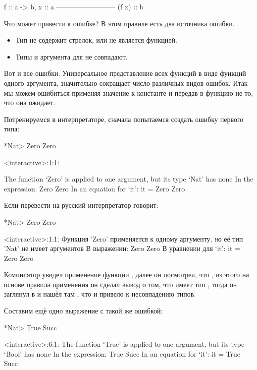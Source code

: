 \begin{code}
                    f :: a -> b,       x :: a
                    --------------------------
                            (f x) :: b
\end{code}

Что может привести к ошибке? В этом правиле есть два источника ошибки.

\begin{itemize}
\item
  Тип  не содержит стрелок, или  не является функцией.
\item
  Типы  и аргумента для  не совпадают.
\end{itemize}

Вот и все ошибки. Универсальное представление всех функций в виде
функций одного аргумента, значительно сокращает число различных видов
ошибок. Итак мы можем ошибиться применяя значение к константе и передав
в функцию не то, что она ожидает.

Потренируемся в интерпретаторе, сначала попытаемся создать ошибку
первого типа:


\begin{code}
*Nat> Zero Zero

<interactive>:1:1:

    The function `Zero' is applied to one argument,
    but its type `Nat' has none
    In the expression: Zero Zero
    In an equation for `it': it = Zero Zero
\end{code}

Если перевести на русский интерпретатор говорит:


\begin{code}
*Nat> Zero Zero

<interactive>:1:1:
    Функция 'Zero' применяется к одному аргументу,
    но её тип 'Nat' не имеет аргументов
    В выражении: Zero Zero
    В уравнении для `it': it = Zero Zero
\end{code}

Компилятор увидел применение функции , далее он посмотрел, что
, из этого на основе правила применения он сделал вывод о
том, что  имеет тип , тогда он заглянул в  и
нашёл там , что и привело к несовпадению типов.

Составим ещё одно выражение с такой же ошибкой:


\begin{code}
*Nat> True Succ

<interactive>:6:1:
    The function `True' is applied to one argument,
    but its type `Bool' has none
    In the expression: True Succ
    In an equation for `it': it = True Succ
\end{code}

